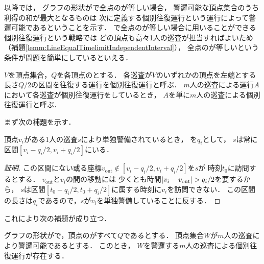 以降では，
グラフの形状が{\graphLine}で全点の{\idletime}が等しい場合，
警邏可能な頂点集合のうち利得の和が最大となるものは
次に定義する個別往復運行という運行によって警邏可能であるということを示す．
{\graphLine}で全点の{\idletime}が等しい場合に用いることができる
個別往復運行という戦略では
どの頂点も高々1人の巡査が担当すればよいため
（補題\ref{lemm:LineEqualTimelimitIndependentInterval}），
全点の{\idletime}が等しいという条件が問題を簡単にしているといえる．


\begin{defi}
  $V$を頂点集合，$Q$を各頂点の{\idletime}とする．
  各巡査が$V$のいずれかの頂点を左端とする長さ$Q/2$の区間を往復する運行を個別往復運行と呼ぶ．
  $m$人の巡査による運行$A$において各巡査が個別往復運行をしているとき，
  $A$を単に$m$人の巡査による個別往復運行と呼ぶ．
\end{defi}



まず次の補題を示す．

\begin{lemm}
  \label{lemm:RangeOfPatrollerOnLine}
  頂点$v_i$がある1人の巡査$s$により単独警備されているとき，
  {\idletime}を$q_i$として，
  $s$は常に区間$[v_i - q_i/2, v_i + q_i/2]$にいる．
\end{lemm}

\begin{proof}[証明]
  \newcommand{\vout}{v_{\mathrm{out}}}
  この区間にない或る座標$\vout \notin [v_i - q_i/2, v_i + q_i/2]$を$s$が
  時刻$t_0$に訪問するとする．
  $\vout$と$v_i$の間の移動には
  少くとも時間$\abs{v_i - \vout} > q _i / 2$を要するから，
  $s$は区間$[t_0 - q _i / 2, t_0 + q _i / 2]$に属する時刻に$v_i$を訪問できない．
  この区間の長さは$
    q_i
  $であるので，$s$が$v _i$を単独警備していることに反する．
\end{proof}



これにより次の補題が成り立つ．


\begin{lemm}
 \label{lemm:LineEqualTimelimitIndependentInterval}
  グラフの形状が{\graphLine}で，頂点の{\idletime}がすべて$Q$であるとする．
  頂点集合$W$が$m$人の巡査により警邏可能であるとする．
  このとき，
  $W$を警邏する$m$人の巡査による個別往復運行が存在する．
\end{lemm}


